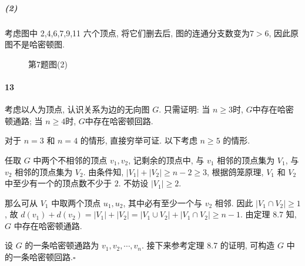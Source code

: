 \documentclass{ctexart}
\def\QED{\hfill $\square$}
\begin{document}
\subparagraph*{(2)} 考虑图中 2,4,6,7,9,11 六个顶点, 将它们删去后,
图的连通分支数变为$7>6$, 因此原图不是哈密顿图.

\begin{figure}[ht]
    \centering
    \quad
    \caption{第7题图(2)}
    \label{fig:8.5.2}
\end{figure}

\paragraph*{13} 考虑以人为顶点, 认识关系为边的无向图 $G$. 只需证明:
当 $n\ge3$时, $G$中存在哈密顿通路; 当 $n\ge4$时, $G$中存在哈密顿回路.

对于 $n=3$ 和 $n=4$ 的情形, 直接穷举可证. 以下考虑 $n\ge5$ 的情形.

任取 $G$ 中两个不相邻的顶点 $v_1, v_2$, 记剩余的顶点中, 与 $v_1$
相邻的顶点集为 $V_1$, 与 $v_2$ 相邻的顶点集为 $V_2$.
由条件知, $|V_1|+|V_2|\ge n-2\ge 3$, 根据鸽笼原理, $V_1$ 和 $V_2$
中至少有一个的顶点数不少于 $2$. 不妨设 $|V_1|\ge 2$.

那么可从 $V_1$ 中取两个顶点 $u_1, u_2$, 其中必有至少一个与 $v_2$ 相邻.
因此 $|V_1\cap V_2|\ge 1$, 故
$d(v_1)+d(v_2)=|V_1|+|V_2| = |V_1\cup V_2| + |V_1\cap V_2|\ge n-1$.
由定理 8.7 知, $G$ 中存在哈密顿通路.

设 $G$ 的一条哈密顿通路为 $v_1, v_2, \cdots, v_n$. 接下来参考定理 8.7 的证明,
可构造 $G$ 中的一条哈密顿回路.\QED
\end{document}
